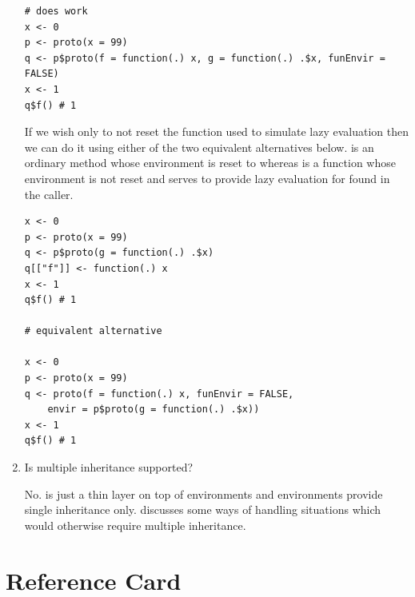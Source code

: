 \documentclass{Z}
\begin{document}
\begin{appendix}
\begin{enumerate}
{\begin{verbatim}
# does work
x <- 0
p <- proto(x = 99)
q <- p$proto(f = function(.) x, g = function(.) .$x, funEnvir = FALSE) 
x <- 1
q$f() # 1
\end{verbatim}

If we wish only to not reset the function used to simulate 
lazy evaluation then we can do it using either of the 
two equivalent alternatives below.  
is an ordinary method whose environment is reset to 
whereas  is a function whose environment is not reset and
serves to provide lazy evaluation for  found in the caller.

\begin{verbatim}
x <- 0
p <- proto(x = 99)
q <- p$proto(g = function(.) .$x) 
q[["f"]] <- function(.) x 
x <- 1
q$f() # 1

# equivalent alternative

x <- 0
p <- proto(x = 99)
q <- proto(f = function(.) x, funEnvir = FALSE, 
	envir = p$proto(g = function(.) .$x))
x <- 1
q$f() # 1
\end{verbatim}

}
\item{Is multiple inheritance supported?  

No.  is just a thin layer on top of  
environments and  environments
provide single inheritance only.  \citep{Kates2004}
discusses some ways of handling situations which would otherwise require
multiple inheritance.}
\end{enumerate}
\newpage{}
\section{Reference Card}
\label{sec:ref}

\end{appendix}
\end{document}

